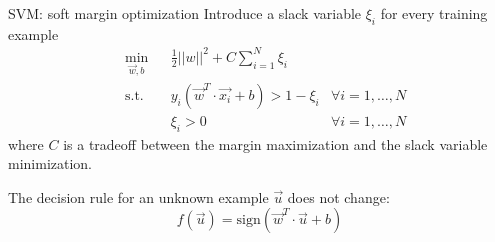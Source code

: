 \begin{frame}{SVM: soft margin optimization}
Introduce a slack variable $\xi_i$ for every training example
\begin{equation*}
\begin{aligned}
& \min_{\vec{w},b} & & \frac{1}{2}||w||^2 + C\sum_{i=1}^N\xi_i\\
&\text{s.t.} & & y_i(\vec{w}^T\cdot\vec{x_i} + b)>1-\xi_i & \forall i=1,\ldots,N\\
& & & \xi_i > 0 & \forall i=1,\ldots,N
\end{aligned}
\end{equation*}
where $C$ is a tradeoff between the margin maximization and the slack variable minimization.

The decision rule for an unknown example $\vec{u}$ does not change:
\begin{equation*}
f(\vec{u}) = \text{sign}(\vec{w}^T\cdot\vec{u} + b)
\end{equation*}


\end{frame}